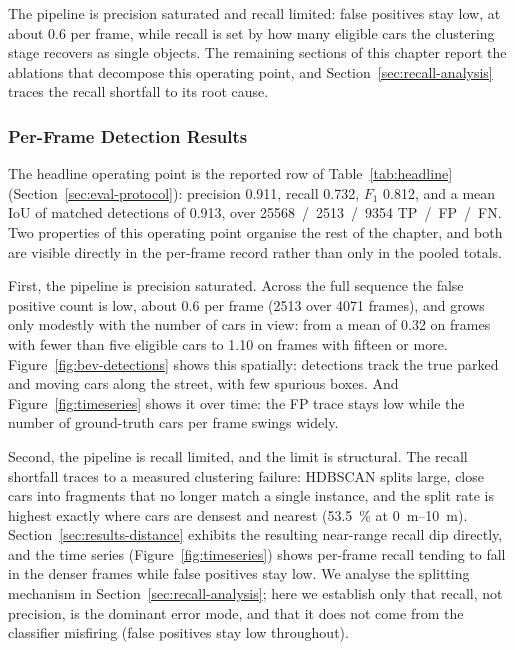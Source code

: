 The pipeline is precision saturated and recall limited: false positives stay low,
at about \num{0.6} per frame, while recall is set by how many eligible cars the
clustering stage recovers as single objects. The remaining sections of this
chapter report the ablations that decompose this operating point, and Section~\ref{sec:recall-analysis}
traces the recall shortfall to its root cause.

\subsubsection{Per-Frame Detection Results}

The headline operating point is the reported row of Table~\ref{tab:headline}
(Section~\ref{sec:eval-protocol}): precision \num{0.911}, recall \num{0.732}, $F_1$ \num{0.812}, and
a mean IoU of matched detections of \num{0.913}, over
\num{25568}~/~\num{2513}~/~\num{9354} TP~/~FP~/~FN. Two properties of this
operating point organise the rest of the chapter, and both are visible directly
in the per-frame record rather than only in the pooled totals.

First, the pipeline is precision saturated. Across the full sequence the
false positive count is low, about \num{0.6} per frame
(\num{2513} over \num{4071} frames), and grows only modestly with the number of cars in view:
from a mean of \num{0.32} on frames with fewer than five eligible cars to \num{1.10} on frames
with fifteen or more.
Figure~\ref{fig:bev-detections} shows this spatially: detections track the
true parked and moving cars along the street, with few spurious boxes. And
Figure~\ref{fig:timeseries} shows it over time: the FP trace stays low
while the number of ground-truth cars per frame swings widely.

Second, the pipeline is recall limited, and the limit is structural. The
recall shortfall traces to a measured clustering failure: HDBSCAN splits large,
close cars into fragments that no longer match a single instance, and the split rate is highest exactly where cars are densest and
nearest (\SI{53.5}{\percent} at \SIrange{0}{10}{\metre}).
Section~\ref{sec:results-distance} exhibits the resulting near-range recall dip
directly, and the time series (Figure~\ref{fig:timeseries}) shows per-frame
recall tending to fall in the denser frames while false positives stay low. We
analyse the splitting mechanism in Section~\ref{sec:recall-analysis}; here we establish only that
recall, not precision, is the dominant error mode, and that it does not come from
the classifier misfiring (false positives stay low throughout).

